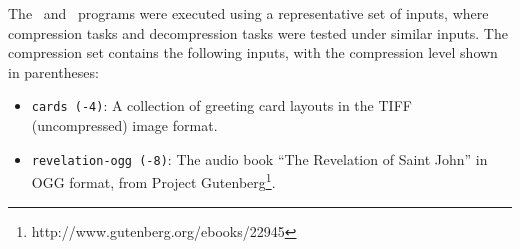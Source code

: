 The \bzip\ and \gzip\ programs were executed using a representative set of inputs, where compression tasks and decompression tasks were tested under similar inputs.
The compression set contains the following inputs, with the compression level shown in parentheses:
\begin{itemize}


\item {\tt cards (-4)}: A collection of greeting card layouts in the TIFF (uncompressed) image format.




\item {\tt revelation-ogg (-8)}: The audio book ``The Revelation of Saint John'' in OGG format, from Project Gutenberg\footnote{http://www.gutenberg.org/ebooks/22945}.


\end{itemize}

